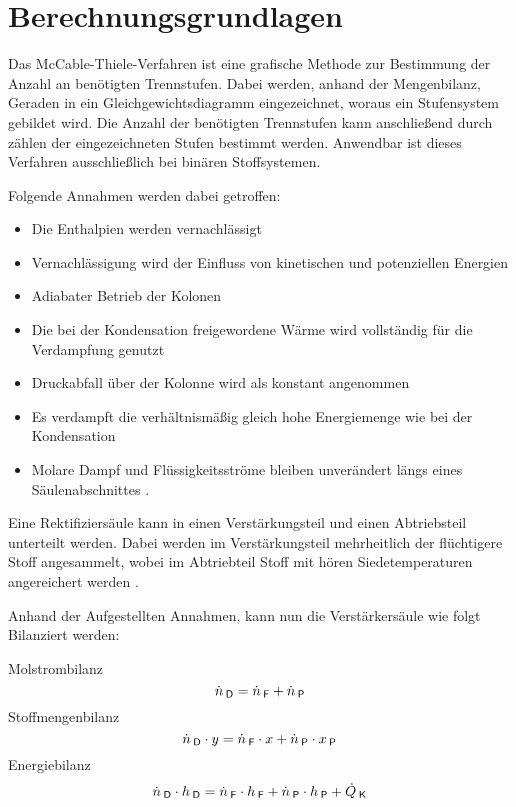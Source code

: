 \documentclass[12pt,a4paper,bibtotocnumbered,liststotocnumbered]{scrreprt}
\begin{document}
\chapter{Berechnungsgrundlagen}
Das McCable-Thiele-Verfahren ist eine grafische Methode zur Bestimmung der Anzahl an benötigten Trennstufen. Dabei werden, anhand der Mengenbilanz, Geraden in ein Gleichgewichtsdiagramm eingezeichnet, woraus ein Stufensystem gebildet wird. Die Anzahl der benötigten Trennstufen kann anschließend durch zählen der eingezeichneten Stufen bestimmt werden. Anwendbar ist dieses Verfahren ausschließlich bei binären Stoffsystemen. \cite{Sievers}

Folgende Annahmen werden dabei getroffen:
\begin{itemize}
\item Die Enthalpien werden vernachlässigt 
\item Vernachlässigung wird der Einfluss von kinetischen und potenziellen Energien
\item Adiabater Betrieb der Kolonen 
\item Die bei der Kondensation freigewordene Wärme wird vollständig für die Verdampfung genutzt 
\item Druckabfall über der Kolonne wird als konstant angenommen
\item Es verdampft die verhältnismäßig gleich hohe Energiemenge wie bei der Kondensation
\item Molare Dampf und Flüssigkeitsströme bleiben unverändert längs eines Säulenabschnittes \cite{Sievers}.
\end{itemize}



Eine Rektifiziersäule kann in einen Verstärkungsteil und einen Abtriebsteil unterteilt werden. Dabei werden im Verstärkungsteil mehrheitlich der flüchtigere Stoff angesammelt, wobei im Abtriebteil Stoff mit hören Siedetemperaturen angereichert werden \cite{Sievers}. 

Anhand der Aufgestellten Annahmen, kann nun die Verstärkersäule wie folgt Bilanziert werden:



Molstrombilanz
\begin{equation}
\dot{n}_{\: \mathsf{D}} = \dot{n}_{\: \mathsf{F}} + \dot{n}_{\: \mathsf{P}}
\end{equation}
Stoffmengenbilanz
\begin{equation}
\dot{n}_{\: \mathsf{D}}\cdot y = \dot{n}_{\: \mathsf{F}} \cdot x + \dot{n}_{\: \mathsf{P}} \cdot x_{\: \mathsf{P}}
\end{equation}
Energiebilanz
\begin{equation}
\dot{n}_{\: \mathsf{D}}\cdot h_{\: \mathsf{D}} = \dot{n}_{\: \mathsf{F}} \cdot  h_{\: \mathsf{F}} + \dot{n}_{\: \mathsf{P}} \cdot h_{\: \mathsf{P}} + \dot{Q}_{\: \mathsf{K}}
\end{equation}
\end{document}
